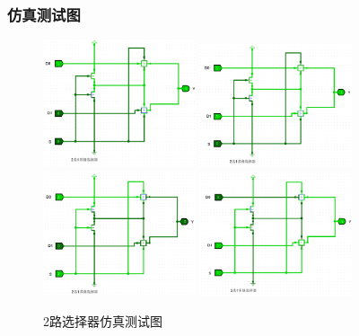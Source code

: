 \documentclass{article}
\begin{document}
    \subsubsection{仿真测试图}
    \begin{figure}[H]
    \centering
    \includegraphics[width=0.4\textwidth]{4.5.1.png}
    \includegraphics[width=0.4\textwidth]{4.5.2.png}
    \includegraphics[width=0.4\textwidth]{4.5.3.png}
    \includegraphics[width=0.4\textwidth]{4.5.4.png}
    \caption{2路选择器仿真测试图}
    \end{figure}
\end{document}
